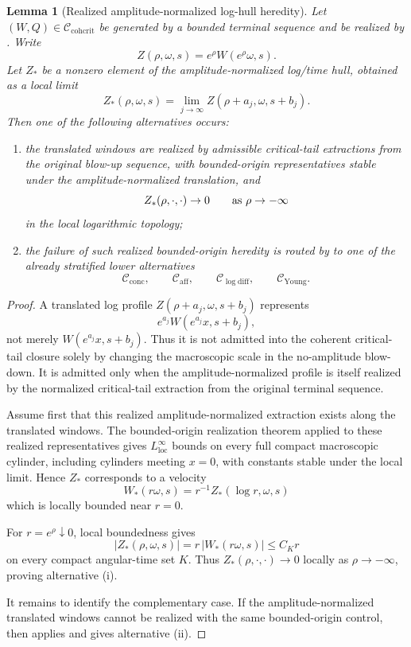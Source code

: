 \documentclass[11pt]{amsart}
\numberwithin{equation}{section}
\theoremstyle{plain}
\newtheorem{lemma}[lemma]{Lemma}
\theoremstyle{definition}
\theoremstyle{remark}
\newcommand{\loc}{\mathrm{loc}}
\newcommand{\Cactive}{\mathcal C_{\mathrm{conc}}}
\newcommand{\Caff}{\mathcal C_{\mathrm{aff}}}
\newcommand{\Ccohcrit}{\mathcal C_{\mathrm{cohcrit}}}
\newcommand{\Cyoung}{\mathcal C_{\mathrm{Young}}}
\newcommand{\Clogdiff}{\mathcal C_{\log\mathrm{diff}}}
\begin{document}
\begin{lemma}[Realized amplitude-normalized log-hull heredity]
\label{lem:realized-amplitude-log-hull-heredity}
Let \((W,Q)\in\Ccohcrit\) be generated by a bounded terminal sequence and be
realized by .  Write
\[
   Z(\rho,\omega,s)=e^\rho W(e^\rho\omega,s).
\]
Let \(Z_*\) be a nonzero element of the amplitude-normalized log/time hull,
obtained as a local limit
\[
   Z_*(\rho,\omega,s)
   =
   \lim_{j\to\infty}Z(\rho+a_j,\omega,s+b_j).
\]
Then one of the following alternatives occurs:
\begin{enumerate}[label=\textup{(\roman*)}]
   \item the translated windows are realized by admissible critical-tail
   extractions from the original blow-up sequence, with bounded-origin
   representatives stable under the amplitude-normalized translation, and
   \[
      Z_*(\rho,\cdot,\cdot)\to0
      \qquad\hbox{as }\rho\to-\infty
   \]
   in the local logarithmic topology;
   \item the failure of such realized bounded-origin heredity is routed by
    to one of the
   already stratified lower alternatives
   \[
      \Cactive,\qquad \Caff,\qquad \Clogdiff,\qquad \Cyoung.
   \]
\end{enumerate}
\end{lemma}

\begin{proof}
A translated log profile \(Z(\rho+a_j,\omega,s+b_j)\) represents
\[
   e^{a_j}W(e^{a_j}x,s+b_j),
\]
not merely \(W(e^{a_j}x,s+b_j)\).  Thus it is not admitted into the coherent
critical-tail closure solely by changing the macroscopic scale in the
no-amplitude blow-down.  It is admitted only when the amplitude-normalized
profile is itself realized by the normalized critical-tail extraction from the
original terminal sequence.

Assume first that this realized amplitude-normalized extraction exists along
the translated windows.  The bounded-origin realization theorem applied to
these realized representatives gives \(L^\infty_{\loc}\) bounds on every full
compact macroscopic cylinder, including cylinders meeting \(x=0\), with
constants stable under the local limit.  Hence \(Z_*\) corresponds to a
velocity
\[
   W_*(r\omega,s)=r^{-1}Z_*(\log r,\omega,s)
\]
which is locally bounded near \(r=0\).

For \(r=e^\rho\downarrow0\), local boundedness gives
\[
   |Z_*(\rho,\omega,s)|
   =
   r\,|W_*(r\omega,s)|
   \le C_K r
\]
on every compact angular-time set \(K\).  Thus
\(Z_*(\rho,\cdot,\cdot)\to0\) locally as \(\rho\to-\infty\), proving
alternative \textup{(i)}.

It remains to identify the complementary case.  If the amplitude-normalized
translated windows cannot be realized with the same bounded-origin control,
then  applies and gives
alternative \textup{(ii)}.
\end{proof}
\end{document}

